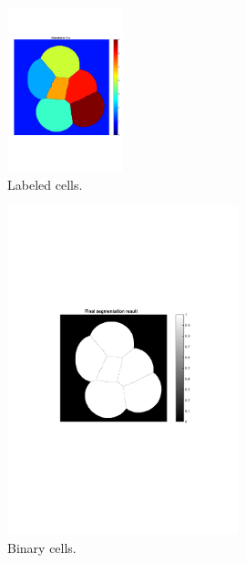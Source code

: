 \documentclass[10pt,twocolumn]{article}
\begin{document}
\begin{figure}[ht]
\centering
\includegraphics[width=0.3\textwidth]{Bilder/CellBwLabeld.pdf}
\caption{Labeled cells.}
\label{fig:CellLabeled}
\end{figure}

\begin{figure}[ht]
\centering
\includegraphics[width=0.6\textwidth]{Bilder/CellBw.pdf}
\caption{Binary cells.}
\label{fig:CellBw}
\end{figure}
\end{document}
